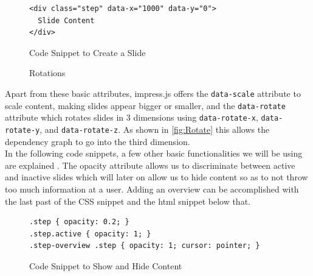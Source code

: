 \documentclass[twoside, 12pt]{article}
\begin{document}
\begin{figure}
\vspace{-26pt}
\begin{verbatim}
<div class="step" data-x="1000" data-y="0">
  Slide Content
</div>
\end{verbatim}
\vspace{-5pt}
  \caption{Code Snippet to Create a Slide}
  \label{fig:SSlide}
  \vspace{12pt}
\end{figure}

\begin{figure}
\vspace{-26pt}
  \begin{center}
  \end{center}
\vspace{-20pt}
  \caption{Rotations \cite{Rotations:npentrel14}}
  \label{fig:Rotate}
\vspace{-10pt}
\end{figure}

Apart from these basic attributes, impress.js offers the \texttt{data-scale} attribute to scale content, making slides appear bigger or smaller, and the \texttt{data-rotate} attribute which rotates slides in 3 dimensions using \texttt{data-rotate-x}, \texttt{data-rotate-y}, and \texttt{data-rotate-z}. As shown in \autoref{fig:Rotate} this allows the dependency graph to go into the third dimension.\\

In the following code snippets, a few other basic functionalities we will be using are explained \cite{andismith:npentrel15}. The opacity attribute allows us to discriminate between active and inactive slides which will later on allow us to hide content so as to not throw too much information at a user. Adding an overview can be accomplished with the last past of the CSS snippet and the html snippet below that.\\

\begin{figure}
\vspace{0pt}
\begin{verbatim}
.step { opacity: 0.2; }
.step.active { opacity: 1; }
.step-overview .step { opacity: 1; cursor: pointer; }
\end{verbatim}
\vspace{-5pt}
  \caption{Code Snippet to Show and Hide Content}
  \label{fig:SSlide}
  \vspace{30pt}
\end{figure}
\end{document}
